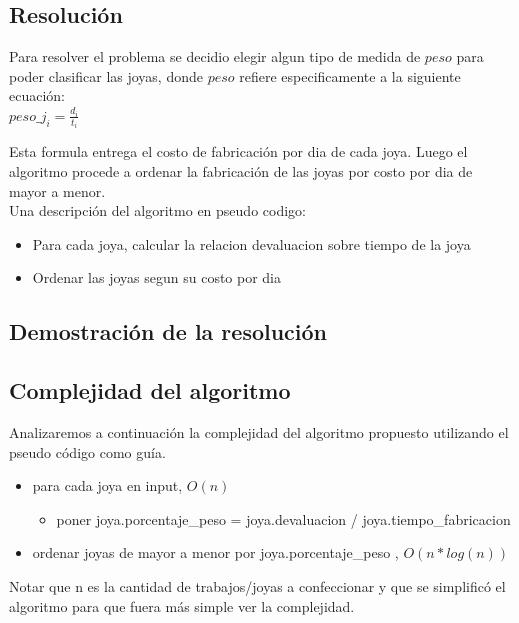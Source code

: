 \subsection{Resoluci\'on}

Para resolver el problema se decidio elegir algun tipo de medida de $peso$ para poder clasificar las joyas, donde $peso$ refiere especificamente a la siguiente ecuaci\'on: \\

$peso\_j_{i} = \frac{d_{i}}{t_{i}}$

Esta formula entrega el costo de fabricaci\'on por dia de cada joya. Luego el algoritmo procede a ordenar la fabricaci\'on de las joyas por costo por dia de mayor a menor. \\

Una descripci\'on del algoritmo en pseudo codigo:

\begin{itemize}
\item Para cada joya, calcular la relacion devaluacion sobre tiempo de la joya
\item Ordenar las joyas segun su costo por dia
\end{itemize}

\subsection{Demostraci\'on de la resoluci\'on}



\subsection{Complejidad del algoritmo}

Analizaremos a continuaci\'on la complejidad del algoritmo propuesto utilizando el pseudo c\'odigo como gu\'ia.

\begin{itemize}
\item para cada  joya en input, $O(n)$
\begin{itemize}
\item poner joya.porcentaje\_peso = joya.devaluacion / joya.tiempo\_fabricacion
\end{itemize}

\item ordenar joyas de mayor a menor por joya.porcentaje\_peso , $O(n*log(n))$
\end{itemize}


Notar que n es la cantidad de trabajos/joyas a confeccionar y que se simplific\'o el algoritmo para que fuera m\'as simple ver la complejidad.


